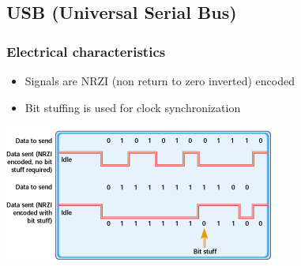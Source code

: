 \subsection{USB (Universal Serial Bus) }
\subsubsection{Electrical characteristics}
\begin{itemize}
	\itemsep-.5em 
	\item Signals are NRZI (non return to zero inverted) encoded
	\item Bit stuffing is used for clock synchronization
\end{itemize}
\includegraphics[width=\columnwidth]{"Images/BitStuffing.png"}

